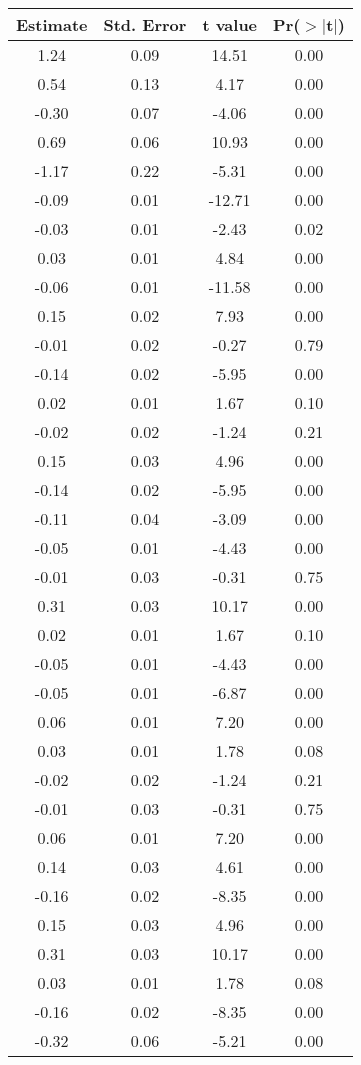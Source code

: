 \begin{table}[ht]
\centering
\begin{tabular}{cccc}
  \hline
Estimate & Std. Error & t value & Pr($>$$|$t$|$) \\ 
  \hline
1.24 & 0.09 & 14.51 & 0.00 \\ 
  0.54 & 0.13 & 4.17 & 0.00 \\ 
  -0.30 & 0.07 & -4.06 & 0.00 \\ 
  0.69 & 0.06 & 10.93 & 0.00 \\ 
  -1.17 & 0.22 & -5.31 & 0.00 \\ 
  -0.09 & 0.01 & -12.71 & 0.00 \\ 
  -0.03 & 0.01 & -2.43 & 0.02 \\ 
  0.03 & 0.01 & 4.84 & 0.00 \\ 
  -0.06 & 0.01 & -11.58 & 0.00 \\ 
  0.15 & 0.02 & 7.93 & 0.00 \\ 
  -0.01 & 0.02 & -0.27 & 0.79 \\ 
  -0.14 & 0.02 & -5.95 & 0.00 \\ 
  0.02 & 0.01 & 1.67 & 0.10 \\ 
  -0.02 & 0.02 & -1.24 & 0.21 \\ 
  0.15 & 0.03 & 4.96 & 0.00 \\ 
  -0.14 & 0.02 & -5.95 & 0.00 \\ 
  -0.11 & 0.04 & -3.09 & 0.00 \\ 
  -0.05 & 0.01 & -4.43 & 0.00 \\ 
  -0.01 & 0.03 & -0.31 & 0.75 \\ 
  0.31 & 0.03 & 10.17 & 0.00 \\ 
  0.02 & 0.01 & 1.67 & 0.10 \\ 
  -0.05 & 0.01 & -4.43 & 0.00 \\ 
  -0.05 & 0.01 & -6.87 & 0.00 \\ 
  0.06 & 0.01 & 7.20 & 0.00 \\ 
  0.03 & 0.01 & 1.78 & 0.08 \\ 
  -0.02 & 0.02 & -1.24 & 0.21 \\ 
  -0.01 & 0.03 & -0.31 & 0.75 \\ 
  0.06 & 0.01 & 7.20 & 0.00 \\ 
  0.14 & 0.03 & 4.61 & 0.00 \\ 
  -0.16 & 0.02 & -8.35 & 0.00 \\ 
  0.15 & 0.03 & 4.96 & 0.00 \\ 
  0.31 & 0.03 & 10.17 & 0.00 \\ 
  0.03 & 0.01 & 1.78 & 0.08 \\ 
  -0.16 & 0.02 & -8.35 & 0.00 \\ 
  -0.32 & 0.06 & -5.21 & 0.00 \\ 
   \hline
\end{tabular}
\end{table}
